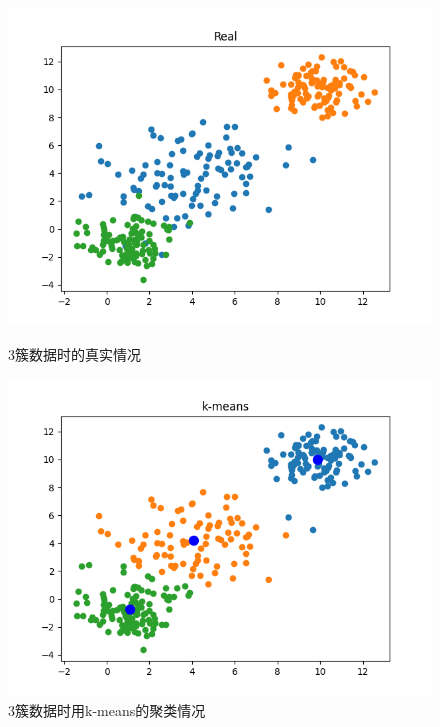 \begin{figure}[htbp]
    \begin{minipage}[t]{0.5\linewidth}
        \centering
        \includegraphics[width=\textwidth]{figures/Figure_3.png}
        \caption{$3$簇数据时的真实情况}
    \end{minipage}
    \begin{minipage}[t]{0.5\linewidth}
        \centering
        \includegraphics[width=\textwidth]{figures/Figure_4.png}
        \caption{$3$簇数据时用k-means的聚类情况}
    \end{minipage}
\end{figure}
